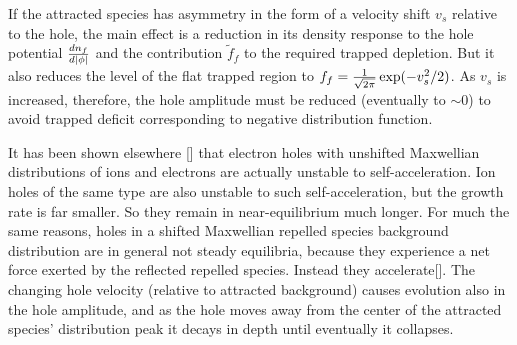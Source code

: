 \documentclass[12pt]{article}  %
\begin{document}
If the attracted species has asymmetry in the form of a velocity shift
$v_s$ relative to the hole, the main effect is a reduction in its
density response to the hole potential ${dn_f\over d|\phi|}$ and the
contribution $\tilde f_f$ to the required trapped depletion. But it
also reduces the level of the flat trapped region to
$f_f={1\over \sqrt{2\pi}}\exp(-v_s^2/2)$. As $v_s$ is increased,
therefore, the hole amplitude must be reduced (eventually to $\sim 0$)
to avoid trapped deficit corresponding to negative distribution
function. 

It has been shown elsewhere [] that electron holes with unshifted
Maxwellian distributions of ions and electrons are actually unstable
to self-acceleration. Ion holes of the same type are also unstable to
such self-acceleration, but the growth rate is far smaller. So they
remain in near-equilibrium much longer. For much the same reasons,
holes in a shifted Maxwellian repelled species background distribution
are in general not steady equilibria, because they experience a net
force exerted by the reflected repelled species. Instead they
accelerate[]. The changing hole velocity (relative to attracted
background) causes evolution also in the hole amplitude, and as the
hole moves away from the center of the attracted species' distribution
peak it decays in depth until eventually it collapses.




\end{document}
